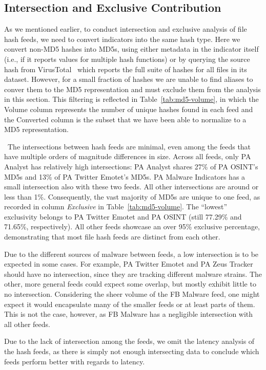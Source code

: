 \subsection{Intersection and Exclusive Contribution}
\label{sec:hash-overlap}

As we mentioned earlier, to conduct intersection and exclusive
analysis of file hash feeds, we need to convert indicators into the
same hash type. Here we convert non-MD5 hashes into MD5s, using either
metadata in the indicator itself (i.e., if it reports values for
multiple hash functions) or by querying the source hash from
VirusTotal~\cite{VirusTotal} which reports the full suite of hashes
for all files in its dataset.  However, for a small fraction of hashes
we are unable to find aliases to conver them to the MD5 representation
and must exclude them from the analysis in this section.  This filtering is
reflected in Table~\ref{tab:md5-volume}, in which the Volume column
represents the number of unique hashes found in each feed and the Converted
column is the subset that we have been able to normalize to a MD5
representation.

\finding\ The intersections between hash feeds are minimal,
even among the feeds that have multiple orders of magnitude differences in size.
Across all feeds, only PA Analyst has relatively high intersections: PA Analyst
shares 27\% of PA OSINT's MD5s and 13\% of PA Twitter Emotet's MD5s. PA Malware
Indicators has a small intersection also with these two feeds. All other
intersections are around or less than 1\%. Consequently, the vast majority of
MD5s are unique to one feed, as recorded in column \textit{Exclusive} in
Table~\ref{tab:md5-volume}. The ``lowest'' exclusivity belongs to PA Twitter
Emotet and PA OSINT (still 77.29\% and 71.65\%, respectively). All other feeds
showcase an over 95\% exclusive percentage, demonstrating that most file hash feeds
are distinct from each other.

Due to the different sources of malware between feeds, a low intersection is to
be expected in some cases. For example, PA Twitter Emotet and PA Zeus Tracker
should have no intersection, since they are tracking different malware strains.
The other, more general feeds could expect some overlap, but mostly exhibit
little to no intersection. Considering the sheer volume of the FB Malware feed,
one might expect it would encapsulate many of the smaller feeds or at least
parts of them. This is not the case, however, as FB Malware has a negligible
intersection with all other feeds.

Due to the lack of intersection among the feeds, we omit the latency analysis
of the hash feeds, as there is simply not enough intersecting data to conclude
which feeds perform better with regards to latency.
